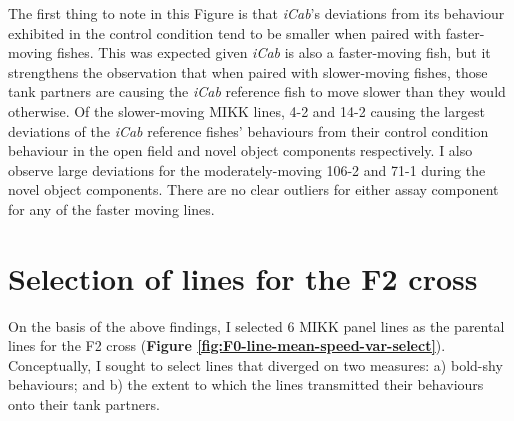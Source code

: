 \documentclass[
]{book}
\begin{document}
The first thing to note in this Figure is that \emph{\textcolor{iCab_424B4D}{iCab}}'s deviations from its behaviour exhibited in the control condition tend to be smaller when paired with faster-moving fishes. This was expected given \emph{\textcolor{iCab_424B4D}{iCab}} is also a faster-moving fish, but it strengthens the observation that when paired with slower-moving fishes, those tank partners are causing the \emph{\textcolor{iCab_424B4D}{iCab}} reference fish to move slower than they would otherwise. Of the slower-moving MIKK lines, \textcolor{4-2_FC61D4}{4-2} and \textcolor{14-2_F066EA}{14-2} causing the largest deviations of the \emph{\textcolor{iCab_424B4D}{iCab}} reference fishes' behaviours from their control condition behaviour in the open field and novel object components respectively. I also observe large deviations for the moderately-moving \textcolor{106-2_00B9E3}{106-2} and \textcolor{71-1_00BECD}{71-1} during the novel object components. There are no clear outliers for either assay component for any of the faster moving lines.

\hypertarget{selection-of-lines-for-the-f2-cross}{%
\section{Selection of lines for the F2 cross}\label{selection-of-lines-for-the-f2-cross}}

On the basis of the above findings, I selected 6 MIKK panel lines as the parental lines for the F2 cross (\textbf{Figure \ref{fig:F0-line-mean-speed-var-select}}). Conceptually, I sought to select lines that diverged on two measures: a) bold-shy behaviours; and b) the extent to which the lines transmitted their behaviours onto their tank partners.
\end{document}
